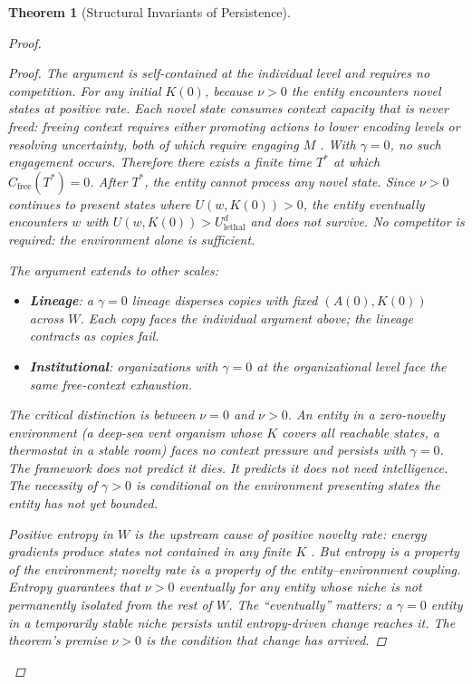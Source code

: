 \documentclass[11pt]{article}
\newtheorem{theorem}{Theorem}
\theoremstyle{definition}
\theoremstyle{remark}
\begin{document}
\begin{theorem}[Structural Invariants of Persistence]
\begin{proof}
\begin{proof}
The argument is self-contained at the individual level and requires no
competition. For any initial $K(0)$, because $\nu > 0$ the entity
encounters novel states at positive rate. Each novel state consumes
context capacity that is never freed: freeing context requires either
promoting actions to lower encoding levels or resolving uncertainty,
both of which require engaging $M$ \cite{McCarthy2026b, McCarthy2026d}.
With $\gamma = 0$, no such engagement occurs. Therefore there exists a
finite time $T^*$ at which $C_{\mathrm{free}}(T^*) = 0$. After $T^*$,
the entity cannot process any novel state. Since $\nu > 0$ continues
to present states where $U(w, K(0)) > 0$, the entity eventually
encounters $w$ with $U(w, K(0)) > U_{\mathrm{lethal}}^d$ and does not
survive. No competitor is required: the environment alone is
sufficient.

The argument extends to other scales:
\begin{itemize}
\item \textbf{Lineage}: a $\gamma = 0$ lineage disperses copies with
      fixed $(A(0), K(0))$ across $W$. Each copy faces the individual
      argument above; the lineage contracts as copies fail.
\item \textbf{Institutional}: organizations with $\gamma = 0$ at the
      organizational level face the same free-context exhaustion.
\end{itemize}

The critical distinction is between $\nu = 0$ and $\nu > 0$. An entity
in a zero-novelty environment (a deep-sea vent organism whose $K$
covers all reachable states, a thermostat in a stable room) faces no
context pressure and persists with $\gamma = 0$. The framework does not
predict it dies. It predicts it does not need intelligence. The
necessity of $\gamma > 0$ is conditional on the environment presenting
states the entity has not yet bounded.

Positive entropy in $W$ is the upstream cause of positive novelty rate:
energy gradients produce states not contained in any finite $K$
\cite{Cover2006, Ashby1956}. But entropy is a property of the
environment; novelty rate is a property of the entity--environment
coupling. Entropy guarantees that $\nu > 0$ eventually for any entity
whose niche is not permanently isolated from the rest of $W$. The
``eventually'' matters: a $\gamma = 0$ entity in a temporarily stable
niche persists until entropy-driven change reaches it. The theorem's
premise $\nu > 0$ is the condition that change has arrived.


\end{proof}
\end{proof}
\end{theorem}
\end{document}
